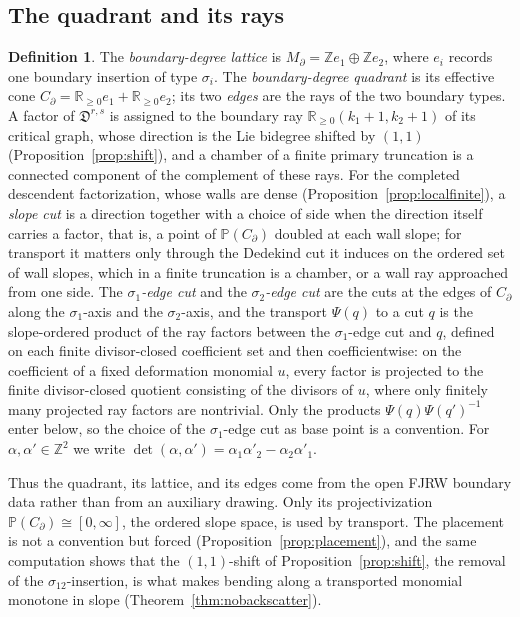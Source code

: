 \documentclass[11pt]{amsart}
\theoremstyle{definition}
\newtheorem{definition}[theorem]{Definition}
\theoremstyle{remark}
\newcommand{\ZZ}{\mathbb{Z}}
\newcommand{\RR}{\mathbb{R}}
\newcommand{\Dscr}{\mathfrak{D}}
\begin{document}
\subsection{The quadrant and its rays}
\label{ssec:sector}
\begin{definition}
\label{def:sector}
The \emph{boundary-degree lattice} is
$M_{\partial}=\ZZ e_{1}\oplus\ZZ e_{2}$, where $e_i$ records one boundary
insertion of type $\sigma_i$.  The \emph{boundary-degree quadrant} is its
effective cone $C_{\partial}=\RR_{\ge0}e_1+\RR_{\ge0}e_2$; its two \emph{edges}
are the rays of the two boundary types. A factor of $\Dscr^{r,s}$ is assigned
to the boundary ray $\RR_{\ge0}(k_{1}{+}1,k_{2}{+}1)$ of its critical graph,
whose direction is the Lie bidegree shifted by $(1,1)$
(Proposition~\ref{prop:shift}), and a chamber of a finite primary truncation is a connected
component of the complement of these rays. For the completed descendent
factorization, whose walls are dense (Proposition~\ref{prop:localfinite}), a
\emph{slope cut} is a direction together with a choice of side when the
direction itself carries a factor, that is, a point of
$\mathbb P(C_\partial)$ doubled at each wall slope; for transport it matters
only through the Dedekind cut it induces on the ordered set of wall slopes,
which in a finite truncation is a chamber, or a wall ray approached from one
side.  The \emph{$\sigma_1$-edge cut} and the \emph{$\sigma_2$-edge cut} are
the cuts at the edges of $C_\partial$ along the $\sigma_{1}$-axis and the
$\sigma_2$-axis, and the transport $\Psi(q)$ to a cut $q$ is the
slope-ordered product of the ray
factors between the $\sigma_1$-edge cut and $q$, defined on each finite
divisor-closed coefficient set and
then coefficientwise: on the coefficient of a fixed deformation monomial $u$,
every factor is projected to the finite divisor-closed quotient consisting of
the divisors of $u$, where only finitely many projected ray factors are
nontrivial.  Only the products $\Psi(q)\Psi(q')^{-1}$ enter below,
so the choice of the $\sigma_1$-edge cut as base point is a convention.  For
$\alpha,\alpha'\in\ZZ^{2}$ we write
$\det(\alpha,\alpha')=\alpha_{1}\alpha'_{2}-\alpha_{2}\alpha'_{1}$.
\end{definition}

Thus the quadrant, its lattice, and its edges come from the open FJRW boundary
data rather than from an auxiliary drawing. Only its projectivization
$\mathbb P(C_{\partial})\cong[0,\infty]$, the ordered slope space, is used by
transport. The placement is not a convention but forced
(Proposition~\ref{prop:placement}), and the same computation shows that the
$(1,1)$-shift of Proposition~\ref{prop:shift}, the removal of the
$\sigma_{12}$-insertion, is what makes bending along a transported monomial
monotone in slope (Theorem~\ref{thm:nobackscatter}).
\end{document}
